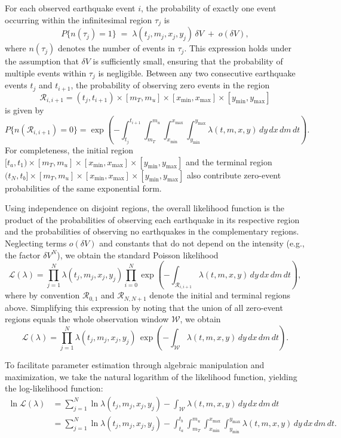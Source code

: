 \documentclass[extra,mreferee]{gji}
\theoremstyle{lemma}
\begin{document}
For each observed earthquake event \( i \), the probability of exactly one event occurring within the infinitesimal region \( \tau_j \) is
\[
P\{n(\tau_j) = 1\} \;=\; \lambda(t_j, m_j, x_j, y_j)\,\delta V \;+\; o(\delta V),
\]
where \( n(\tau_j) \) denotes the number of events in \( \tau_j \). This expression holds under the assumption that \( \delta V \) is sufficiently small, ensuring that the probability of multiple events within \( \tau_j \) is negligible. Between any two consecutive earthquake events \( t_j \) and \( t_{i+1} \), the probability of observing zero events in the region
\[
\mathcal{R}_{i,i+1} = (t_j, t_{i+1}) \times [m_T, m_u] \times [x_{\mathrm{min}}, x_{\mathrm{max}}] \times [y_{\mathrm{min}}, y_{\mathrm{max}}]
\]
is given by
\[
P\{n(\mathcal{R}_{i,i+1}) = 0\} = \exp\left(-\int_{t_j}^{t_{i+1}} \int_{m_T}^{m_u} \int_{x_{\mathrm{min}}}^{x_{\mathrm{max}}} \int_{y_{\mathrm{min}}}^{y_{\mathrm{max}}} \lambda(t, m, x, y) \, dy \, dx \, dm \, dt\right).
\]
For completeness, the initial region \( [t_a,t_1) \times [m_T,m_u] \times [x_{\min},x_{\max}] \times [y_{\min},y_{\max}] \) and the terminal region \( (t_N,t_b] \times [m_T,m_u] \times [x_{\min},x_{\max}] \times [y_{\min},y_{\max}] \) also contribute zero-event probabilities of the same exponential form.

Using independence on disjoint regions, the overall likelihood function is the product of the probabilities of observing each earthquake in its respective region and the probabilities of observing no earthquakes in the complementary regions. Neglecting terms \(o(\delta V)\) and constants that do not depend on the intensity (e.g., the factor \(\delta V^N\)), we obtain the standard Poisson likelihood
\[
\mathcal{L}(\lambda) = \prod_{j=1}^N  \lambda(t_j, m_j, x_j, y_j) \prod_{i=0}^{N} \exp\left(-\int_{\mathcal{R}_{i,i+1}} \lambda(t, m, x, y) \, dy \, dx \, dm \, dt\right),
\]
where by convention \(\mathcal{R}_{0,1}\) and \(\mathcal{R}_{N,N+1}\) denote the initial and terminal regions above. Simplifying this expression by noting that the union of all zero-event regions equals the whole observation window \( \mathcal{W} \), we obtain
\[
\mathcal{L}(\lambda) = \prod_{j=1}^N \lambda(t_j, m_j, x_j, y_j) \,\exp\left(-\int_{\mathcal{W}} \lambda(t, m, x, y) \, dy \, dx \, dm \, dt\right).
\]

To facilitate parameter estimation through algebraic manipulation and maximization, we take the natural logarithm of the likelihood function, yielding the log-likelihood function:
\begin{align*}
\ln \mathcal{L}(\lambda) &=  \sum_{j=1}^N \ln \lambda(t_j, m_j, x_j, y_j) - \int_{\mathcal{W}} \lambda(t, m, x, y) \, dy \, dx \, dm \, dt\\
& = \sum_{j=1}^N \ln \lambda(t_j, m_j, x_j, y_j) - \int_{t_a}^{t_b} \int_{m_T}^{m_u} \int_{x_{\mathrm{min}}}^{x_{\mathrm{max}}} \int_{y_{\mathrm{min}}}^{y_{\mathrm{max}}} \lambda(t, m, x, y) \, dy \, dx \, dm \, dt.
\end{align*}
\end{document}
